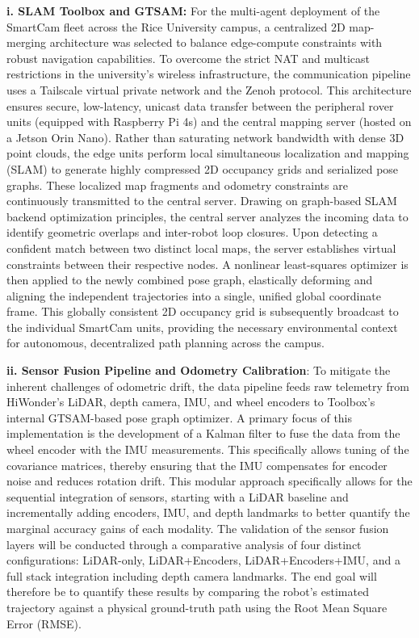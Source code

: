 \documentclass[journal,transmag]{IEEEtran}
\begin{document}
\textbf{i. SLAM Toolbox and GTSAM:} For the multi-agent deployment of the SmartCam fleet across the Rice University campus, a centralized 2D map-merging architecture was selected to balance edge-compute constraints with robust navigation capabilities. To overcome the strict NAT and multicast restrictions in the university's wireless infrastructure, the communication pipeline uses a Tailscale virtual private network and the Zenoh protocol. This architecture ensures secure, low-latency, unicast data transfer between the peripheral rover units (equipped with Raspberry Pi 4s) and the central mapping server (hosted on a Jetson Orin Nano). Rather than saturating network bandwidth with dense 3D point clouds, the edge units perform local simultaneous localization and mapping (SLAM) to generate highly compressed 2D occupancy grids and serialized pose graphs. These localized map fragments and odometry constraints are continuously transmitted to the central server. Drawing on graph-based SLAM backend optimization principles, the central server analyzes the incoming data to identify geometric overlaps and inter-robot loop closures. Upon detecting a confident match between two distinct local maps, the server establishes virtual constraints between their respective nodes. A nonlinear least-squares optimizer is then applied to the newly combined pose graph, elastically deforming and aligning the independent trajectories into a single, unified global coordinate frame. This globally consistent 2D occupancy grid is subsequently broadcast to the individual SmartCam units, providing the necessary environmental context for autonomous, decentralized path planning across the campus.

\textbf{ii. Sensor Fusion Pipeline and Odometry Calibration}: To mitigate the inherent challenges of odometric drift, the data pipeline feeds raw telemetry from HiWonder's LiDAR, depth camera, IMU, and wheel encoders to Toolbox's internal GTSAM-based pose graph optimizer. A primary focus of this implementation is the development of a Kalman filter to fuse the data from the wheel encoder with the IMU measurements. This specifically allows tuning of the covariance matrices, thereby ensuring that the IMU compensates for encoder noise and reduces rotation drift. This modular approach specifically allows for the sequential integration of sensors, starting with a LiDAR baseline and incrementally adding encoders, IMU, and depth landmarks to better quantify the marginal accuracy gains of each modality. The validation of the sensor fusion layers will be conducted through a comparative analysis of four distinct configurations: LiDAR-only, LiDAR+Encoders, LiDAR+Encoders+IMU, and a full stack integration including depth camera landmarks. The end goal will therefore be to quantify these results by comparing the robot's estimated trajectory against a physical ground-truth path using the Root Mean Square Error (RMSE).
\end{document}
